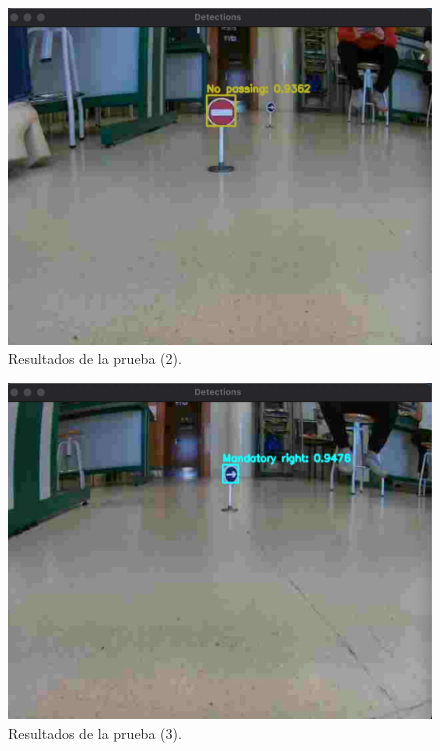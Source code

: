 \begin{figure}[H]
    \centering
 	\includegraphics[width=\textwidth]{Imagenes/IA/YoloCNN_coche2.pdf}
    \caption{Resultados de la prueba (2).}
    \label{c2}
\end{figure}

\begin{figure}[H]
    \centering
 	\includegraphics[width=\textwidth]{Imagenes/IA/YoloCNN_coche3.pdf}
    \caption{Resultados de la prueba (3).}
    \label{c3}
\end{figure}

